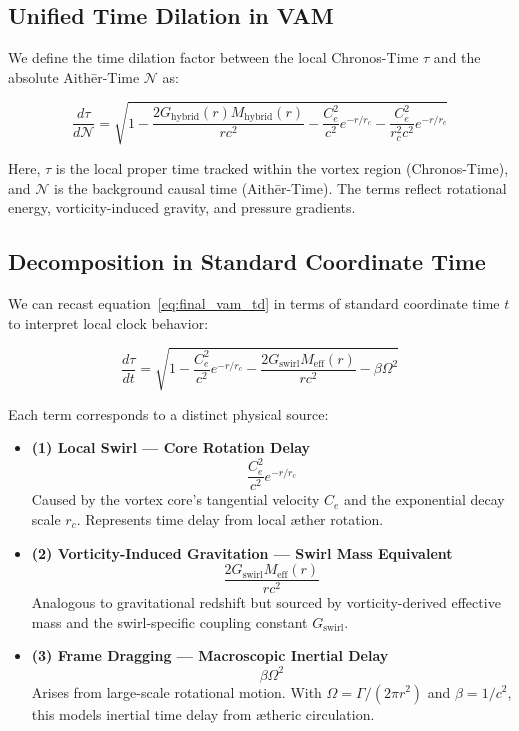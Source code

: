 \subsection{Unified Time Dilation in VAM}
We define the time dilation factor between the local Chronos-Time $\tau$ and the absolute Aith\=er-Time $\mathcal{N}$ as:

\begin{equation}
    \boxed{
        \frac{d\tau}{d\mathcal{N}} = \sqrt{
            1
            - \frac{2 G_{\text{hybrid}}(r) M_{\text{hybrid}}(r)}{r c^2}
            - \frac{C_e^2}{c^2} e^{-r/r_c}
            - \frac{C_e^2}{r_c^2 c^2} e^{-r/r_c}
        }}
    \label{eq:final_vam_td}
\end{equation}

Here, $\tau$ is the local proper time tracked within the vortex region (Chronos-Time), and $\mathcal{N}$ is the background causal time (Aith\=er-Time). The terms reflect rotational energy, vorticity-induced gravity, and pressure gradients.

\subsection{Decomposition in Standard Coordinate Time}
We can recast equation~\eqref{eq:final_vam_td} in terms of standard coordinate time $t$ to interpret local clock behavior:

\begin{equation}
    \frac{d\tau}{dt} = \sqrt{
        1
        - \frac{C_e^2}{c^2} e^{-r/r_c}
        - \frac{2 G_\text{swirl} M_\text{eff}(r)}{r c^2}
        - \beta \Omega^2
    }
\end{equation}

Each term corresponds to a distinct physical source:

\begin{itemize}
    \item \textbf{(1) Local Swirl --- Core Rotation Delay}
    \[
        \frac{C_e^2}{c^2} e^{-r/r_c}
    \]
    Caused by the vortex core's tangential velocity $C_e$ and the exponential decay scale $r_c$. Represents time delay from local \ae{}ther rotation.

    \item \textbf{(2) Vorticity-Induced Gravitation --- Swirl Mass Equivalent}
    \[
        \frac{2 G_\text{swirl} M_\text{eff}(r)}{r c^2}
    \]
    Analogous to gravitational redshift but sourced by vorticity-derived effective mass and the swirl-specific coupling constant $G_\text{swirl}$.

    \item \textbf{(3) Frame Dragging --- Macroscopic Inertial Delay}
    \[
        \beta \Omega^2
    \]
    Arises from large-scale rotational motion. With $\Omega = \Gamma / (2\pi r^2)$ and $\beta = 1/c^2$, this models inertial time delay from \ae{}theric circulation.
\end{itemize}

